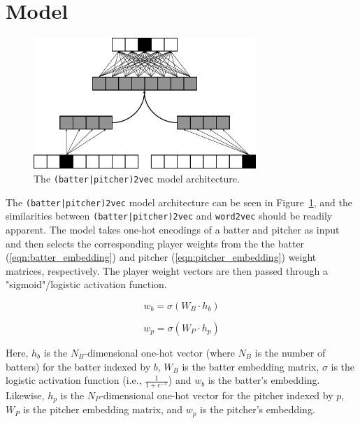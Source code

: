 \documentclass{article}
\begin{document}
\section{Model}
\label{model}

\begin{figure}[h]
\centering
\includegraphics[width=0.75\textwidth,height=\textheight,keepaspectratio]{batter_pitcher_model.png}
\caption{The \texttt{(batter|pitcher)2vec} model architecture.}
\label{fig:batter_pitcher}
\end{figure}

The \texttt{(batter|pitcher)2vec} model architecture can be seen in Figure~\ref{fig:batter_pitcher}, and the similarities between \texttt{(batter|pitcher)2vec} and \texttt{word2vec} should be readily apparent. The model takes one-hot encodings of a batter and pitcher as input and then selects the corresponding player weights from the the batter (\ref{eqn:batter_embedding}) and pitcher (\ref{eqn:pitcher_embedding}) weight matrices, respectively. The player weight vectors are then passed through a "sigmoid"/logistic activation function.

\begin{equation}
\label{eqn:batter_embedding}
w_b = \sigma(W_B \cdot h_b)
\end{equation}

\begin{equation}
\label{eqn:pitcher_embedding}
w_p = \sigma(W_P \cdot h_p)
\end{equation}

Here, $h_b$ is the $N_B$-dimensional one-hot vector (where $N_B$ is the number of batters) for the batter indexed by $b$, $W_B$ is the batter embedding matrix, $\sigma$ is the logistic activation function (i.e., $\frac{1}{1 + e^{-x}}$) and $w_b$ is the batter's embedding. Likewise, $h_p$ is the $N_P$-dimensional one-hot vector for the pitcher indexed by $p$, $W_P$ is the pitcher embedding matrix, and $w_p$ is the pitcher's embedding.
\end{document}
